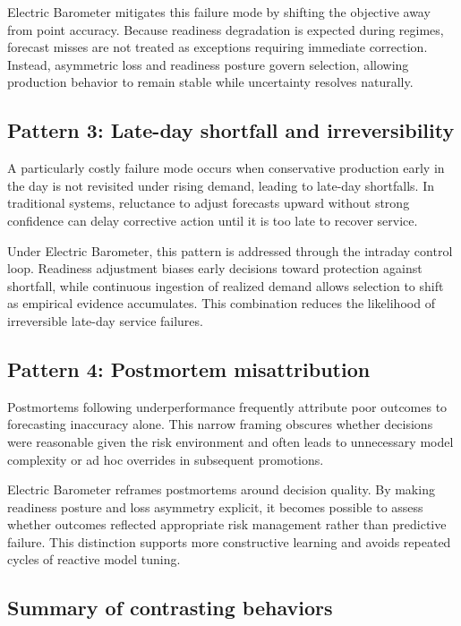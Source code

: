 Electric Barometer mitigates this failure mode by shifting the objective away from point accuracy.
Because readiness degradation is expected during \LTO{} regimes, forecast misses are not treated as
exceptions requiring immediate correction. Instead, asymmetric loss and readiness posture govern
selection, allowing production behavior to remain stable while uncertainty resolves naturally.

\subsection{Pattern 3: Late-day shortfall and irreversibility}
\label{subsec:late-day-shortfall}

A particularly costly failure mode occurs when conservative production early in the day is not
revisited under rising demand, leading to late-day shortfalls. In traditional systems, reluctance to
adjust forecasts upward without strong confidence can delay corrective action until it is too late to
recover service.

Under Electric Barometer, this pattern is addressed through the intraday control loop. Readiness
adjustment biases early decisions toward protection against shortfall, while continuous ingestion of
realized demand allows selection to shift as empirical evidence accumulates. This combination
reduces the likelihood of irreversible late-day service failures.

\subsection{Pattern 4: Postmortem misattribution}
\label{subsec:postmortem-misattribution}

Postmortems following \LTO{} underperformance frequently attribute poor outcomes to forecasting
inaccuracy alone. This narrow framing obscures whether decisions were reasonable given the risk
environment and often leads to unnecessary model complexity or ad hoc overrides in subsequent
promotions.

Electric Barometer reframes postmortems around decision quality. By making readiness posture and
loss asymmetry explicit, it becomes possible to assess whether outcomes reflected appropriate risk
management rather than predictive failure. This distinction supports more constructive learning and
avoids repeated cycles of reactive model tuning.

\subsection{Summary of contrasting behaviors}
\label{subsec:pattern-summary}

